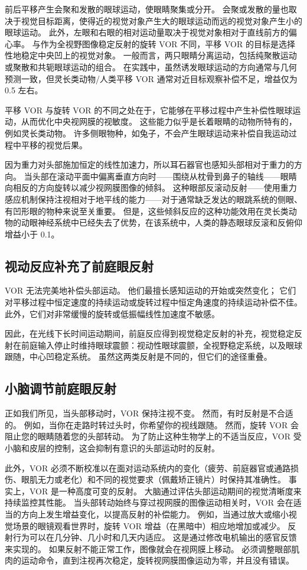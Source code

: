 前后平移产生会聚和发散的眼球运动，使眼睛聚集或分开。 会聚或发散的量也取决于视觉目标距离，使得近的视觉对象产生大的眼球运动而远的视觉对象产生小的眼球运动。 此外，左眼和右眼的相对运动量取决于视觉对象相对于直线前方的偏心率。 与作为全视野图像稳定反射的旋转 VOR 不同，平移 VOR 的目标是选择性地稳定中央凹上的视觉对象。 一般而言，两只眼睛分离运动，包括纯聚散运动或聚散和共轭眼球运动的组合。 在实践中，虽然诱发眼球运动的方向通常与几何预测一致，但灵长类动物/人类平移 VOR 通常对近目标观察补偿不足，增益仅为 0.5 左右。

平移 VOR 与旋转 VOR 的不同之处在于，它能够在平移过程中产生补偿性眼球运动，从而优化中央视网膜的视敏度。 这些能力似乎是长着眼睛的动物所特有的，例如灵长类动物。 许多侧眼物种，如兔子，不会产生眼球运动来补偿自我运动过程中平移的视觉后果。

因为重力对头部施加恒定的线性加速力，所以耳石器官也感知头部相对于重力的方向。 当头部在滚动平面中偏离垂直方向时——围绕从枕骨到鼻子的轴线——眼睛向相反的方向旋转以减少视网膜图像的倾斜。 这种眼部反滚动反射——使用重力感应机制保持注视相对于地平线的能力——对于通常缺乏发达的眼跳系统的侧眼、有凹形眼的物种来说至关重要。 但是，这些倾斜反应的这种功能效用在灵长类动物的动眼神经系统中已经失去了优势，在该系统中，人类的静态眼球反滚和反俯仰增益小于 0.1。


\subsection{视动反应补充了前庭眼反射}
VOR 无法完美地补偿头部运动。 他们最擅长感知运动的开始或突然变化； 它们对平移过程中恒定速度的持续运动或旋转过程中恒定角速度的持续运动补偿不佳。 此外，它们对非常缓慢的旋转或低振幅线性加速度不敏感。

因此，在光线下长时间运动期间，前庭反应得到视觉稳定反射的补充，视觉稳定反射在前庭输入停止时维持眼球震颤：视动性眼球震颤，全视野稳定系统，以及眼球跟随，中心凹稳定系统。 虽然这两类反射是不同的，但它们的途径重叠。


\subsection{小脑调节前庭眼反射}
正如我们所见，当头部移动时，VOR 保持注视不变。 然而，有时反射是不合适的。 例如，当你在走路时转过头时，你希望你的视线跟随。 然而，旋转 VOR 会阻止您的眼睛随着您的头部转动。 为了防止这种生物学上的不适当反应，VOR 受小脑和皮层的控制，这会抑制有意识的头部运动时的反射。

此外，VOR 必须不断校准以在面对运动系统内的变化（疲劳、前庭器官或通路损伤、眼肌无力或老化）和不同的视觉要求（佩戴矫正镜片）时保持其准确性。 事实上，VOR 是一种高度可变的反射。 大脑通过评估头部运动期间的视觉清晰度来持续监控其性能。 当头部转动始终与穿过视网膜的图像运动相关时，VOR 会在适当的方向上发生增益变化，以提高反射的补偿能力。 例如，当通过放大或缩小视觉场景的眼镜观看世界时，旋转 VOR 增益（在黑暗中）相应地增加或减少。 反射行为可以在几分钟、几小时和几天内适应。 这是通过修改电机输出的感官反馈来实现的。 如果反射不能正常工作，图像就会在视网膜上移动。 必须调整眼部肌肉的运动命令，直到注视再次稳定，旋转视网膜图像运动为零，并且没有错误。

